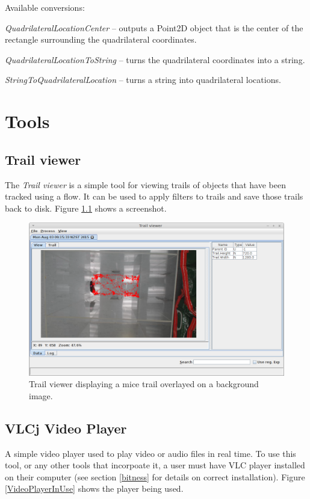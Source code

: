 \documentclass[a4paper]{book}
\begin{document}
\noindent Available conversions:
\begin{tight_itemize}
  \item \textit{QuadrilateralLocationCenter} -- outputs a Point2D object that
  is the center of the rectangle surrounding the quadrilateral coordinates.
  \item \textit{QuadrilateralLocationToString} -- turns the quadrilateral
  coordinates into a string.
  \item \textit{StringToQuadrilateralLocation} -- turns a string into quadrilateral
  locations.
\end{tight_itemize}

\chapter{Tools}

\section{Trail viewer}
The \textit{Trail viewer} is a simple tool for viewing trails of objects that
have been tracked using a flow. It can be used to apply filters to trails
and save those trails back to disk. Figure \ref{trail_viewer} shows a screenshot.

\begin{figure}[htb]
  \centering
  \includegraphics[width=12.0cm]{images/trail_viewer.png}
  \caption{Trail viewer displaying a mice trail overlayed on a background image.}
  \label{trail_viewer}
\end{figure}

\section{VLCj Video Player}
A simple video player used to play video or audio files in real time. To use
this tool, or any other tools that incorpoate it, a user must have VLC player
installed on their computer (see section \ref{bitness} for details on correct
installation). Figure \ref{VideoPlayerInUse} shows the player being used.
\end{document}
